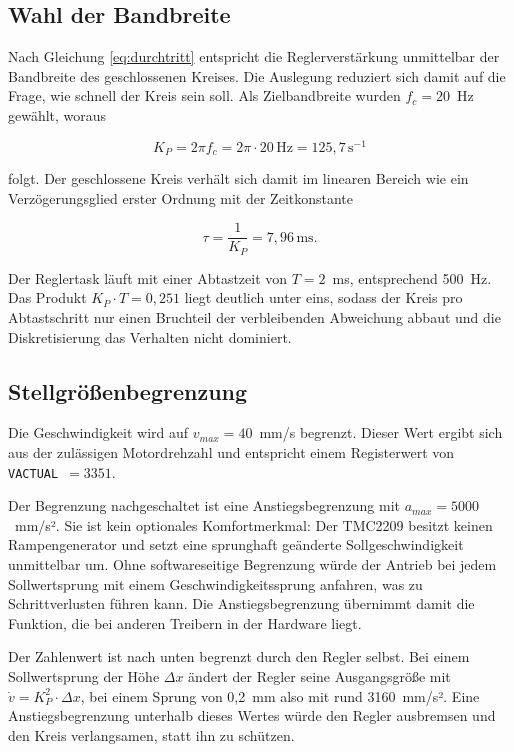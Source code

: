 \subsection*{Wahl der Bandbreite}

Nach Gleichung \ref{eq:durchtritt} entspricht die Reglerverstärkung unmittelbar der
Bandbreite des geschlossenen Kreises. Die Auslegung reduziert sich damit auf die Frage,
wie schnell der Kreis sein soll. Als Zielbandbreite wurden $f_c = 20$~Hz gewählt, woraus

\begin{equation}
    K_P = 2\pi f_c = 2\pi \cdot 20\,\mathrm{Hz} = 125{,}7\,\mathrm{s^{-1}}
    \label{eq:kp}
\end{equation}

folgt. Der geschlossene Kreis verhält sich damit im linearen Bereich wie ein
Verzögerungsglied erster Ordnung mit der Zeitkonstante

\begin{equation}
    \tau = \frac{1}{K_P} = 7{,}96\,\mathrm{ms} .
    \label{eq:tau}
\end{equation}

Der Reglertask läuft mit einer Abtastzeit von $T = 2$~ms, entsprechend 500~Hz. Das
Produkt $K_P \cdot T = 0{,}251$ liegt deutlich unter eins, sodass der Kreis pro Abtastschritt
nur einen Bruchteil der verbleibenden Abweichung abbaut und die Diskretisierung das
Verhalten nicht dominiert.

\subsection*{Stellgrößenbegrenzung}

Die Geschwindigkeit wird auf $v_{max} = 40$~mm/s begrenzt. Dieser Wert ergibt sich aus der
zulässigen Motordrehzahl und entspricht einem Registerwert von \texttt{VACTUAL}~$= 3351$.

Der Begrenzung nachgeschaltet ist eine Anstiegsbegrenzung mit $a_{max} = 5000$~mm/s².
Sie ist kein optionales Komfortmerkmal: Der TMC2209 besitzt keinen Rampengenerator und
setzt eine sprunghaft geänderte Sollgeschwindigkeit unmittelbar um. Ohne softwareseitige
Begrenzung würde der Antrieb bei jedem Sollwertsprung mit einem Geschwindigkeitssprung
anfahren, was zu Schrittverlusten führen kann. Die Anstiegsbegrenzung übernimmt damit
die Funktion, die bei anderen Treibern in der Hardware liegt.

Der Zahlenwert ist nach unten begrenzt durch den Regler selbst. Bei einem Sollwertsprung
der Höhe $\Delta x$ ändert der Regler seine Ausgangsgröße mit
$\dot{v} = K_P^2 \cdot \Delta x$, bei einem Sprung von 0,2~mm also mit rund
3160~mm/s². Eine Anstiegsbegrenzung unterhalb dieses Wertes würde den Regler ausbremsen
und den Kreis verlangsamen, statt ihn zu schützen.

